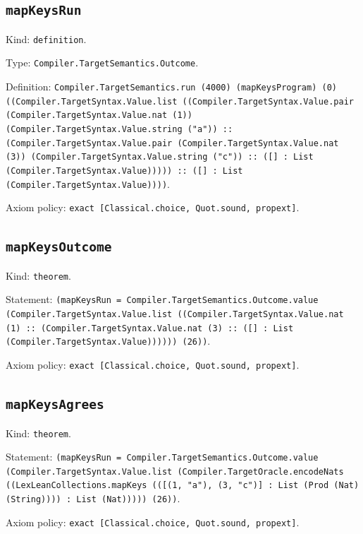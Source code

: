 \documentclass[11pt]{article}
\begin{document}
\subsection*{\texttt{mapKeysRun}}
\noindent Kind: \texttt{definition}.\par
\noindent Type: \texttt{Compiler.TargetSemantics.Outcome}.\par
\noindent Definition: \texttt{Compiler.TargetSemantics.run (4000) (mapKeysProgram) (0) ((Compiler.TargetSyntax.Value.list ((Compiler.TargetSyntax.Value.pair (Compiler.TargetSyntax.Value.nat (1)) (Compiler.TargetSyntax.Value.string ("a")) :: (Compiler.TargetSyntax.Value.pair (Compiler.TargetSyntax.Value.nat (3)) (Compiler.TargetSyntax.Value.string ("c")) :: ([] : List (Compiler.TargetSyntax.Value))))) :: ([] : List (Compiler.TargetSyntax.Value))))}.\par
\noindent Axiom policy: \texttt{exact [Classical.choice, Quot.sound, propext]}.\par
\subsection*{\texttt{mapKeysOutcome}}
\noindent Kind: \texttt{theorem}.\par
\noindent Statement: \texttt{(mapKeysRun = Compiler.TargetSemantics.Outcome.value (Compiler.TargetSyntax.Value.list ((Compiler.TargetSyntax.Value.nat (1) :: (Compiler.TargetSyntax.Value.nat (3) :: ([] : List (Compiler.TargetSyntax.Value)))))) (26))}.\par
\noindent Axiom policy: \texttt{exact [Classical.choice, Quot.sound, propext]}.\par
\subsection*{\texttt{mapKeysAgrees}}
\noindent Kind: \texttt{theorem}.\par
\noindent Statement: \texttt{(mapKeysRun = Compiler.TargetSemantics.Outcome.value (Compiler.TargetSyntax.Value.list (Compiler.TargetOracle.encodeNats ((LexLeanCollections.mapKeys (([(1, "a"), (3, "c")] : List (Prod (Nat) (String)))) : List (Nat))))) (26))}.\par
\noindent Axiom policy: \texttt{exact [Classical.choice, Quot.sound, propext]}.\par
\end{document}
